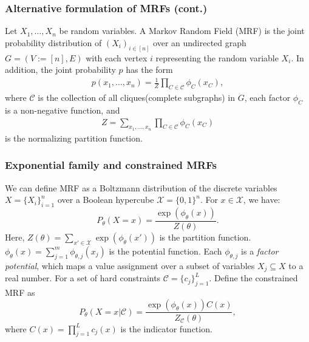 \documentclass{beamer}
\begin{document}
\begin{frame} \frametitle{Alternative formulation of MRFs (cont.)}
  \begin{definition}
    Let $X_1,\dots,X_n$ be random variables. A Markov Random Field (MRF) is the joint probability distribution of $(X_i)_{i \in [n]}$ over an undirected graph $G=(V:=[n],E)$ with each vertex $i$ representing the random variable $X_i$. In addition, the joint probability $p$ has the form
    \begin{align}
      p(x_1,\dots,x_n) = \frac{1}{Z} \prod_{C \in \mathcal{C}} \phi_C(x_C),
    \end{align}
    where $\mathcal{C}$ is the collection of all cliques(complete subgraphs) in $G$, each factor $\phi_C$ is a non-negative function, and
    \begin{align}
      Z = \sum_{x_1,\dots,x_n} \prod_{C \in \mathcal{C}} \phi_C(x_C)
    \end{align}
    is the normalizing partition function.
  \end{definition}
\end{frame}

\begin{frame} \frametitle{Exponential family and constrained MRFs}
  We can define MRF as a Boltzmann distribution of the discrete
  variables $X=\{X_i\}_{i=1}^n$ over a Boolean hypercube $\mathcal{X}=\{0,
    1\}^n$. For $x\in\mathcal{X}$, we have:
  \begin{equation} \label{eq:mrf}
    P_{\theta}(X=x)=\frac{\exp \left(\phi_\theta(x)\right)}{Z(\theta)}.%
  \end{equation}
  Here, $Z(\theta)=\sum_{x'\in \mathcal{X}} \exp\left(\phi_\theta(x')\right)$ is the partition function. $\phi_\theta(x)=\sum_{j=1}^m \phi_{\theta,j}(x_{j})$ is the potential function. Each $\phi_{\theta,j}$ is a \textit{factor potential}, which maps a value assignment over a subset of variables $X_j \subseteq X$ to a real number. For a set of hard constraints
  $\mathcal{C}=\{c_j\}_{j=1}^L$. Define the constrained MRF as
  \begin{equation} \label{eq:constr_mrf}
    P_{\theta}(X=x|\mathcal{C})=\frac{\exp \left(\phi_\theta(x)\right)C(x)}{Z_\mathcal{C}(\theta)},
  \end{equation}
  where $C(x) = \prod_{j=1}^L c_j(x)$ is the indicator function.
\end{frame}
\end{document}
